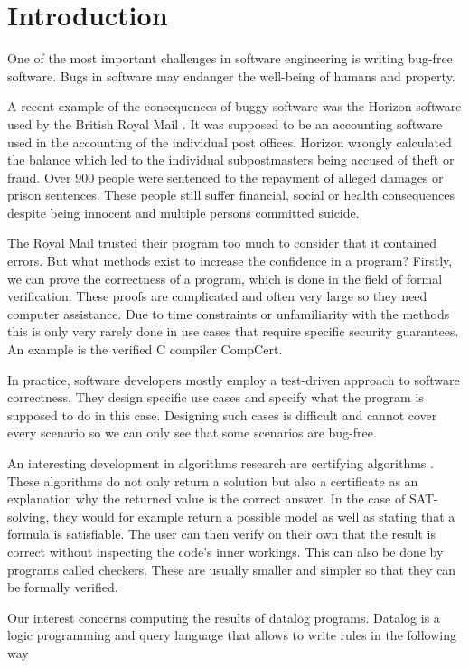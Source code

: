 \section{Introduction}

One of the most important challenges in software engineering is writing bug-free software.  Bugs in software may endanger the well-being of humans and property.

A recent example of the consequences of buggy software was the Horizon software used by the British Royal Mail \cite{horizonRoyalMail}. It was supposed to be an accounting software used in the accounting of the individual post offices. Horizon wrongly calculated the balance which led to the individual subpostmasters being accused of theft or fraud. Over 900 people were sentenced to the repayment of alleged damages or prison sentences. These people still suffer financial, social or health consequences despite being innocent and multiple persons committed suicide.

The Royal Mail trusted their program too much to consider that it contained errors. But what methods exist to increase the confidence in a program?
Firstly, we can prove the correctness of a program, which is done in the field of formal verification. These proofs are complicated and often very large so they need computer assistance. Due to time constraints or unfamiliarity with the methods this is only very rarely done in use cases that require specific security guarantees. An example is the verified C compiler CompCert\cite{CCertComp}.

In practice, software developers mostly employ a test-driven approach to software correctness. They design specific use cases and specify what the program is supposed to do in this case. Designing such cases is difficult and cannot cover every scenario so we can only see that some scenarios are bug-free.

An interesting development in algorithms research are certifying algorithms \cite{CertAlg}. These algorithms do not only return a solution but also a certificate as an explanation why the returned value is the correct answer. In the case of SAT-solving, they would for example return a possible model as well as stating that a formula is satisfiable. The user can then verify on their own that the result is correct without inspecting the code's inner workings. This can also be done by programs called checkers. These are usually smaller and simpler so that they can be formally verified. 

Our interest concerns computing the results of datalog programs. Datalog is a logic programming and query language that allows to write rules in the following way

